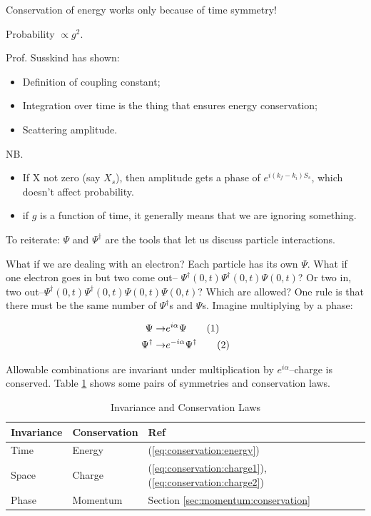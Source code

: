 \documentclass[]{article}
\newcommand\numberthis{\addtocounter{equation}{1}\tag{\theequation}}
\begin{document}
Conservation of energy works only because of time symmetry!

Probability $\propto g^2$.

Prof. Susskind has shown:
\begin{itemize}
	\item Definition of coupling constant;
	\item Integration over time is the thing that ensures energy conservation;
	\item Scattering amplitude.
\end{itemize}

NB.\begin{itemize}
	\item  If X not zero (say $X_s$), then amplitude gets a phase of $e^{i(k_f-k_i)S_s}$, which doesn't affect probability.
	\item if $g$ is a function of time, it generally means that we are ignoring something.
\end{itemize}

To reiterate: $\Psi$ and $\Psi^\dagger$ are the tools that let us discuss particle interactions.

What if we are dealing with an electron? Each particle has its own $\Psi$. What if one electron goes in but two come out-- $\Psi^\dagger(0,t)\Psi^\dagger(0,t)\Psi(0,t)$? Or two in, two out--$\Psi^\dagger(0,t)\Psi^\dagger(0,t)\Psi(0,t)\Psi(0,t)$? Which are allowed? One rule is that there must be the same number of $\Psi^\dagger$s and $\Psi$s. Imagine multiplying by a phase:

\begin{align*}
\Psi \rightarrow & e^{i\alpha} \Psi \numberthis \label{eq:conservation:charge1}\\
\Psi^\dagger \rightarrow & e^{-i\alpha} \Psi^\dagger \numberthis \label{eq:conservation:charge2}
\end{align*}

Allowable combinations are invariant under multiplication by $e^{i\alpha}$--charge is conserved. Table \ref{table:conserve} shows some pairs of symmetries and conservation laws.

\begin{table}[H]
	\caption{Invariance and Conservation Laws}\label{table:conserve}
	\begin{center}
			\begin{tabular}{|l|l|l|}  \hline
				Invariance&Conservation&Ref\\ \hline
				Time& Energy&(\ref{eq:conservation:energy})\\  \hline
				Space&Charge&(\ref{eq:conservation:charge1}),  (\ref{eq:conservation:charge2})\\ \hline
				Phase&Momentum&Section \ref{sec:momentum:conservation}\\ \hline
			\end{tabular}
	\end{center}
\end{table}
\end{document}
